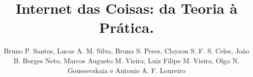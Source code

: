 \documentclass{SBCbookchapter}
\title{Internet das Coisas: da Teoria à Prática.}
\author{Bruno P. Santos, Lucas A. M. Silva, Bruna S. Peres, Clayson S. F. S.  
Celes, João B. Borges Neto, Marcos Augusto M. Vieira, Luiz Filipe M. Vieira, 
Olga 
N. Goussevskaia e Antonio A. F. Loureiro}
\begin{document}
\maketitle

\begin{abstract}
\end{abstract}
\end{document}
